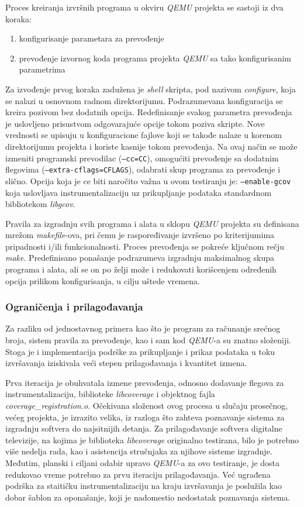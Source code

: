 \documentclass[12pt,oneside]{memoir}
\newcommand{\kod}[1]{\texttt{#1}}
\newcommand{\strano}[1]{\textit{#1}}
\begin{document}
Proces kreiranja izvršnih programa u okviru \strano{QEMU} projekta se sastoji iz dva koraka:
\begin{enumerate}
\item konfigurisanje parametara za prevođenje
\item prevođenje izvornog koda programa projekta \strano{QEMU} sa tako konfigurisanim parametrima
\end{enumerate}
Za izvođenje prvog koraka zadužena je \strano{shell} skripta, pod nazivom \strano{configure}, koja se nalazi u osnovnom radnom direktorijumu. Podrazumevana konfiguracija se kreira pozivom bez dodatnih opcija. Redefinisanje svakog parametra prevođenja je uslovljeno prisustvom odgovarajuće opcije tokom poziva skripte. Nove vrednosti se upisuju u konfiguracione fajlove koji se takođe nalaze u korenom direktorijumu projekta i koriste kasnije tokom prevođenja. Na ovaj način se može izmeniti programski prevodilac (\kod{--cc=CC}), omogućiti prevođenje sa dodatnim flegovima (\kod{--extra-cflags=CFLAGS}), odabrati skup programa za prevođenje i slično. Opcija koja je ce biti naročito važna u ovom testiranju je: \kod{--enable-gcov} koja uslovljava instrumentalizaciju uz prikupljanje podataka standardnom bibliotekom \strano{libgcov}.

Pravila za izgradnju svih programa i alata u sklopu \strano{QEMU} projekta su definisana mrežom \strano{makefile}-ova, pri čemu je raspoređivanje izvršeno po kriterijumima pripadnosti i/ili funkcionalnosti. Proces prevođenja se pokreće ključnom rečju \strano{make}. Predefinisano ponašanje podrazumeva izgradnju maksimalnog skupa programa i alata, ali se on po želji može i redukovati korišcenjem određenih opcija prilikom konfigurisanja, u cilju uštede vremena.

\subsubsection{Ograničenja i prilagođavanja}

Za razliku od jednostavnog primera kao što je program za računanje srećnog broja, sistem pravila za prevođenje, kao i sam kod \strano{QEMU}-a su znatno složeniji. Stoga je i implementacija podrške za prikupljanje i prikaz podataka u toku izvršavanja iziskivala veći stepen prilagođavanja i kvantitet izmena. 

Prva iteracija je obuhvatala izmene prevođenja, odnosno dodavanje flegova za instrumentalizaciju, biblioteke \strano{libcoverage} i objektnog fajla \strano{coverage\_registration.o}. 
Očekivana složenost ovog procesa u slučaju prosečnog, većeg projekta, je izrazito velika, iz razloga što zahteva poznavanje sistema za izgradnju softvera do najsitnijih detanja. Za prilagođavanje softvera digitalne televizije, na kojima je biblioteka \strano{libcoverage} originalno testirana, bilo je potrebno više nedelja rada, kao i asistencija stručnjaka za njihove sisteme izgradnje. Međutim, planski i ciljani odabir upravo \strano{QEMU}-a za ovo testiranje, je dosta redukovao vreme potrebno za prvu iteraciju prilagođavanja. Već ugrađena podrška za staitičku instrumentalizaciju na kraju izvršavanja je poslužila kao dobar šablon za oponašanje, koji je nadomestio nedostatak poznavanja sistema. 
\end{document}
